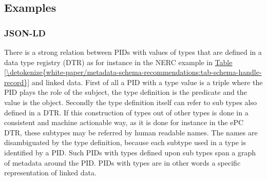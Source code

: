 \documentclass[a4paper,10pt,english]{sphinxmanual}
\begin{document}
\subsection{Examples}
\label{\detokenize{white-paper/landing-page-encoding:examples}}

\subsubsection{JSON-LD}
\label{\detokenize{white-paper/landing-page-encoding:json-ld}}
There is a strong relation between PIDs with values of types that are
defined in a data type registry (DTR) as for instance in the NERC
example in \hyperref[\detokenize{white-paper/metadata-schema-recommendations:tab-schema-handle-record}]{Table \ref{\detokenize{white-paper/metadata-schema-recommendations:tab-schema-handle-record}}} and linked data. First
of all a PID with a type value is a triple where the PID plays the
role of the subject, the type definition is the predicate and the
value is the object. Secondly the type definition itself can refer to
sub types also defined in a DTR. If this construction of types out of
other types is done in a consistent and machine actionable way, as it
is done for instance in the ePC DTR, these subtypes may be referred by
human readable names. The names are disambiguated by the type
definition, because each subtype used in a type is identified by a
PID. Such PIDs with types defined upon sub types span a graph of
metadata around the PID. PIDs with types are in other words a specific
representation of linked data.
\end{document}
